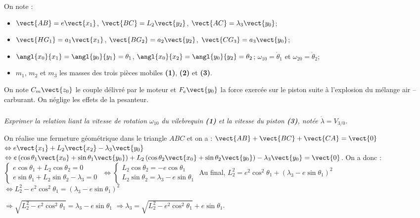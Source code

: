 \begin{multicols}{2}
\begin{center}
\end{center}
\fi
On note : 
\begin{itemize}
\item $\vect{AB}=e\vect{x_1}$, $\vect{BC}=L_2\vect{y_2}$, $\vect{AC}=\lambda_3\vect{y_0}$;
\item $\vect{HG_1}=a_1\vect{x_1}$, $\vect{BG_2}=a_2\vect{y_2}$, $\vect{CG_3}=a_3\vect{y_0}$;
\item $\angl{x_0}{x_1}=\angl{y_0}{y_1}=\theta_1$, $\angl{x_0}{x_2}=\angl{y_0}{y_2}=\theta_2$; $\omega_{10}=\dot{\theta}_1$ et $\omega_{20}=\dot{\theta}_2$;
\item $m_1$, $m_2$ et $m_3$ les masses des trois pièces mobiles \textbf{(1)}, \textbf{(2)} et \textbf{(3)}.
\end{itemize}

On note $C_m \vect{z_0}$ le couple délivré par le moteur et $F_e \vect{y_0}$ la force exercée sur le piston suite à l'explosion du mélange air -- carburant. On néglige les effets de la pesanteur.

\subparagraph{}
\textit{Exprimer la relation liant la vitesse de rotation $\omega_{10}$ du vilebrequin \textbf{(1)} et la vitesse du piston \textbf{(3)}, notée $\dot{\lambda}=V_{3/0}$.}%

\ifprof
\begin{corrige}
On réalise une fermeture géométrique dans le triangle $ABC$ et on a : 
$\vect{AB}+\vect{BC}+\vect{CA}=\vect{0}$ $\Leftrightarrow e\vect{x_1}+L_2\vect{x_2}-\lambda_3 \vect{y_0}$ $\Leftrightarrow e\left( \cos \theta_1 \vect{x_0}+\sin \theta_1 \vect{y_0} \right)+L_2\left( \cos \theta_2 \vect{x_0}+\sin \theta_2 \vect{y_0} \right)-\lambda_3 \vect{y_0} = \vect{0}$. 
On a donc : 
$\left\{
\begin{array}{l}
e\cos \theta_1 +L_2 \cos \theta_2 = 0 \\
e\sin \theta_1 + L_2 \sin \theta_2 -\lambda_3 = 0
\end{array}
\right.$
$\Leftrightarrow \left\{
\begin{array}{l}
L_2 \cos \theta_2 = -e\cos \theta_1  \\
L_2 \sin \theta_2  = \lambda_3-e\sin \theta_1
\end{array}
\right.
$
Au final, $L_2^2 = e^2\cos^2 \theta_1 + \left(\lambda_3-e\sin \theta_1\right)^2$
$\Leftrightarrow L_2^2 - e^2\cos^2 \theta_1 = \left(\lambda_3-e\sin \theta_1\right)^2$

$\Rightarrow \sqrt{L_2^2 - e^2\cos^2 \theta_1} = \lambda_3-e\sin \theta_1$
$ \Rightarrow \lambda_3 = \sqrt{L_2^2 - e^2\cos^2 \theta_1}+e\sin \theta_1$.


\end{corrige}
\end{multicols}
